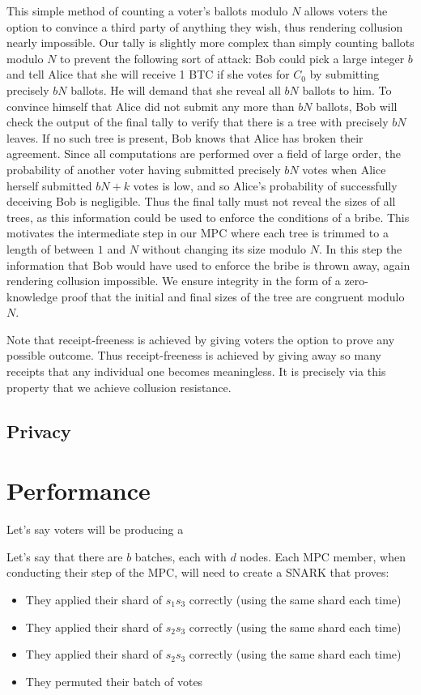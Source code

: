 \documentclass{article}
\begin{document}
This simple method of counting a voter's ballots modulo $N$ allows voters the option to convince a third party of anything they wish, thus rendering collusion nearly impossible.  Our tally is slightly more complex than simply counting ballots modulo $N$ to prevent the following sort of attack: Bob could pick a large integer $b$ and tell Alice that she will receive 1 BTC if she votes for $C_0$ by submitting precisely $bN$ ballots.  He will demand that she reveal all $bN$ ballots to him.  To convince himself that Alice did not submit any more than $bN$ ballots, Bob will check the output of the final tally to verify that there is a tree with precisely $bN$ leaves.  If no such tree is present, Bob knows that Alice has broken their agreement.  Since all computations are performed over a field of large order, the probability of another voter having submitted precisely $bN$ votes when Alice herself submitted $bN+k$ votes is low, and so Alice's probability of successfully deceiving Bob is negligible.  Thus the final tally must not reveal the sizes of all trees, as this information could be used to enforce the conditions of a bribe.  This motivates the intermediate step in our MPC where each tree is trimmed to a length of between $1$ and $N$ without changing its size modulo $N$.  In this step the information that Bob would have used to enforce the bribe is thrown away, again rendering collusion impossible.  We ensure integrity in the form of a zero-knowledge proof that the initial and final sizes of the tree are congruent modulo $N$.

Note that receipt-freeness is achieved by giving voters the option to prove any possible outcome.  Thus receipt-freeness is achieved by giving away so many receipts that any individual one becomes meaningless.  It is precisely via this property that we achieve collusion resistance.

\subsection{Privacy}


\section{Performance}
Let's say voters will be producing a 

Let's say that there are $b$ batches, each with $d$ nodes. Each MPC member, when conducting their step of the MPC, will need to create a SNARK that proves:
\begin{itemize}
    \item They applied their shard of $s_1s_3$ correctly (using the same shard each time)
    \item They applied their shard of $s_2s_3$ correctly (using the same shard each time)
    \item They applied their shard of $s_2s_3$ correctly (using the same shard each time)
    \item They permuted their batch of votes
\end{itemize}
\end{document}
